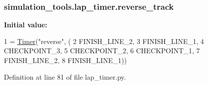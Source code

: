 \subsubsection[{\texorpdfstring{reverse\+\_\+track}{reverse_track}}]{\setlength{\rightskip}{0pt plus 5cm}simulation\+\_\+tools.\+lap\+\_\+timer.\+reverse\+\_\+track}\hypertarget{namespacesimulation__tools_1_1lap__timer_a05166a035886cf7f2693a8f72dc05bbc}{}\label{namespacesimulation__tools_1_1lap__timer_a05166a035886cf7f2693a8f72dc05bbc}
{\bfseries Initial value\+:}
\begin{DoxyCode}
1 = \hyperlink{classsimulation__tools_1_1lap__timer_1_1_timer}{Timer}(\textcolor{stringliteral}{"reverse"}, (
2     FINISH\_LINE\_2,
3     FINISH\_LINE\_1,
4     CHECKPOINT\_3,
5     CHECKPOINT\_2,
6     CHECKPOINT\_1,
7     FINISH\_LINE\_2,
8     FINISH\_LINE\_1))
\end{DoxyCode}


Definition at line 81 of file lap\+\_\+timer.\+py.

